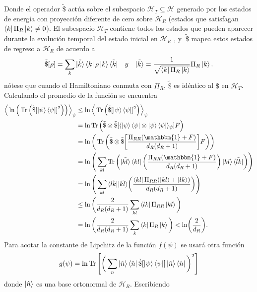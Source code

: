 \begin{enumerate}
Donde el operador  $ \tilde{\$} $ actúa sobre el subespacio $\mathcal{H}_{T} \subseteq \mathcal{H}$ generado por los estados de energía con proyección diferente de cero sobre $\mathcal{H}_{R}$ (estados que satisfagan $\bra{k} \Pi_{R} \ket{k} \neq 0$). El subespacio $\mathcal{H}_{T}$ contiene todos los estados que pueden aparecer durante la evolución temporal del estado inicial en $\mathcal{H}_{R}$ , y $\ \widetilde{\$} $ mapea estos estados de regreso a $\mathcal{H}_{R}$ de acuerdo a 
\begin{equation}
 \tilde{\$}[\rho]= \sum_{k}  \tilde{\ket{k}} \bra{k} \rho \ket{k} \tilde{\bra{k}} \quad y \quad  \tilde{\ket{k}}= \frac{1}{\sqrt{\bra{k}\Pi_{R}\ket{k}}} \Pi_{R} \ket{k}.
\end{equation}
nótese que cuando el Hamiltoniano conmuta con $\Pi_{R}$, $ \tilde{\$}$ es idéntico al $ \$ $ en $\mathcal{H}_{T}$. Calculando el promedio de la función se encuentra
\begin{align*}
\Big \langle \ln \Big( \Tr \Big( \tilde{\$}[ \ket{\psi}\bra{\psi}]^{2} \Big) \Big) \Big \rangle_{\psi} & \leq \ln \Big \langle \Tr \Big( \tilde{\$}[\ket{\psi}\bra{\psi}]^{2} \Big) \Big \rangle_{\psi}\\
&= \ln \Tr\Big( \tilde{\$}\otimes \tilde{\$} [\langle \ket{\psi}\bra{\psi} \otimes \ket{\psi}\bra{\psi} \rangle_{\psi}] F \Big)\\
&= \ln \bigg( \Tr \bigg( \tilde{\$}\otimes \tilde{\$} \bigg[ \frac{\Pi_{RR}(\mathbbm{1}+F)}{d_{R}(d_{R}+1)} \bigg] F   \bigg) \bigg)\\
&= \ln \Bigg( \sum_{kl} \Tr \bigg( \tilde{\ket{kl}} \bra{kl} \bigg( \frac{\Pi_{RR}(\mathbbm{1}+F)}{d_{R}(d_{R}+1)} \bigg) \ket{kl}  \tilde{\bra{lk}}  \bigg) \Bigg)\\
&= \ln \Bigg( \sum_{kl} \tilde{\bra{lk}}\tilde{\ket{kl}} \bigg( \frac{\bra{kl}\Pi_{RR}(\ket{kl}+\ket{lk})}{d_{R}(d_{R}+1)} \bigg) \Bigg)\\
&\leq \ln \bigg( \frac{2}{d_{R}(d_{R}+1)} \sum_{kl} \bra{lk}\Pi_{RR}\ket{kl}  \bigg)\\
&= \ln \bigg(  \frac{2}{d_{R}(d_{R}+1)} \sum_{k} \bra{k}\Pi_{R} \ket{k}  \bigg) < \ln (\frac{2}{d_{R}}).
\end{align*}
Para acotar la constante de Lipchitz  de la función $f(\psi)$ se usará otra función
\begin{equation}
g(\psi)= \ln \Tr \Bigg[  \bigg( \sum_{n} \ket{\hat{n}}\bra{\hat{n}} \tilde{\$} [\ket{\psi}\bra{\psi}] \ket{\hat{n}}\bra{\hat{n}} \bigg)^{2}  \Bigg]
\end{equation}
donde $\ket{\hat{n}}$ es una base ortonormal de $\mathcal{H}_{R}$. Escribiendo


\end{enumerate}

